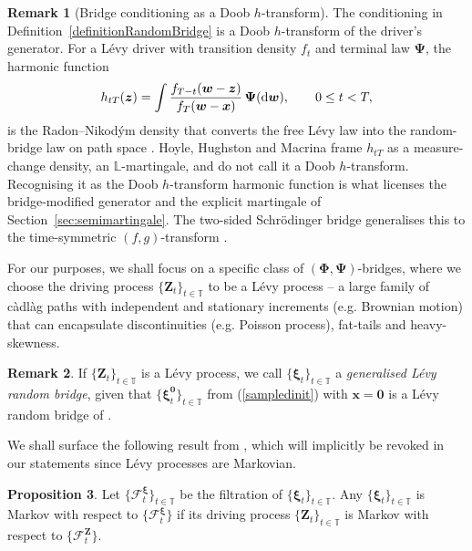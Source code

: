 \documentclass{article}
\newcommand{\levy}{{L\'evy }}
\newcommand{\cadlag}{{c\`adl\`ag }}
\newcommand{\Schrodinger}{Schr\"odinger\xspace}
\def\T{\mathbb{T}}
\def\dd{\mathrm{d}}
\def\F{\mathcal{F}}
\def\xib{\boldsymbol{\xi}}
\theoremstyle{definition}
\newtheorem{proposition}{Proposition}[section]
\newtheorem{remark}[proposition]{Remark}
\begin{document}
\begin{remark}[Bridge conditioning as a Doob $h$-transform]
\label{rem:doob-h-forward}
The conditioning in Definition~\ref{definitionRandomBridge} is a Doob $h$-transform of the driver's
generator. For a \levy driver with transition density $f_t$ and terminal law $\boldsymbol{\Psi}$, the
harmonic function
\begin{align}
  h_{tT}(\boldsymbol{z}) = \int \frac{f_{T-t}(\boldsymbol{w}-\boldsymbol{z})}{f_T(\boldsymbol{w}-\boldsymbol{x})}\,\boldsymbol{\Psi}(\dd \boldsymbol{w}), \qquad 0\le t<T, \notag
\end{align}
is the Radon--Nikod\'ym density that converts the free \levy law into the random-bridge law on path
space \cite[Proposition~2.7]{hoylehughstonmacrina_2011}. Hoyle, Hughston and Macrina frame $h_{tT}$ as
a measure-change density, an $\mathbb{L}$-martingale, and do not call it a Doob $h$-transform.
Recognising it as the Doob $h$-transform harmonic function is what licenses the bridge-modified
generator and the explicit martingale of Section~\ref{sec:semimartingale}. The two-sided \Schrodinger
bridge generalises this to the time-symmetric $(f,g)$-transform \cite{leonard2014survey}.
\end{remark}
For our purposes, we shall focus on a specific class of $(\boldsymbol{\Phi}, \boldsymbol{\Psi})$-bridges, where we choose the driving process $\{\boldsymbol{Z}_t\}_{t\in\T}$ to be a \levy process -- a large family of \cadlag paths with independent and stationary increments (e.g. Brownian motion) that can encapsulate discontinuities (e.g. Poisson process), fat-tails and heavy-skewness.
\begin{remark}
If $\{\boldsymbol{Z}_t\}_{t\in\T}$ is a \levy process, we call $\{\xib_t\}_{t\in\T}$ a \emph{generalised \levy random bridge}, given that $\{\xib^{\boldsymbol{0}}_t\}_{t\in\T}$ from (\ref{sampledinit}) with $\boldsymbol{x} = \boldsymbol{0}$ is a \levy random bridge of \cite{hoylehughstonmacrina_2011}.
\end{remark}
We shall surface the following result from \cite{menguturkmenguturk_2020}, which will implicitly be revoked in our statements since \levy processes are Markovian.
\begin{proposition}
\label{markovprop}
Let $\{\F_{t}^{\xib}\}_{t\in\T}$ be the filtration of $\{\boldsymbol{\xi}_t\}_{t\in\T}$. Any $\{\xib_t\}_{t\in\T}$ is Markov with respect to $\{\F_t^{\xib}\}$ if its driving process $\{\boldsymbol{Z}_t\}_{t\in\T}$ is Markov with respect to $\{\F_t^{\boldsymbol{Z}}\}$.
\end{proposition}
\end{document}
